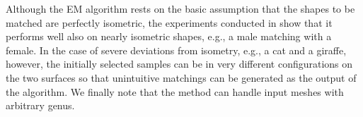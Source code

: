 {Although the EM algorithm rests on the basic assumption that the shapes to be matched are perfectly isometric, the experiments conducted in \cite{ys2012EM} show that it performs well also on nearly isometric shapes, e.g., a male matching with a female. In the case of severe deviations from isometry, e.g., a cat and a giraffe, however,  the initially selected samples can be in very different configurations on the two surfaces so that unintuitive matchings can be generated as the output of the algorithm. We finally note that the method can handle input meshes with arbitrary genus.}
